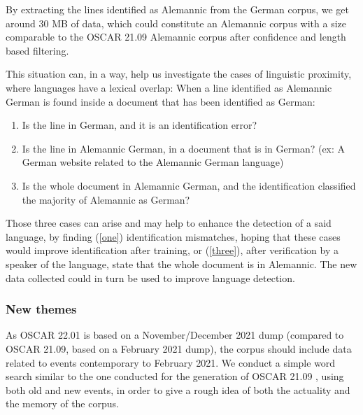 By extracting the lines identified as Alemannic from the German corpus, we get around 30 MB of data, which could constitute an Alemannic corpus with a size comparable to the OSCAR 21.09 Alemannic corpus after confidence and length based filtering.


This situation can, in a way, help us investigate the cases of linguistic proximity, where languages have a lexical overlap: When a line identified as Alemannic German is found inside a document that has been identified as German:
\begin{enumerate}
    \item \label{one} Is the line in German, and it is an identification error?
    \item Is the line in Alemannic German, in a document that is in German? (ex: A German website related to the Alemannic German language)
    \item \label{three} Is the whole document in Alemannic German, and the identification classified the majority of Alemannic as German?
\end{enumerate}

Those three cases can arise and may help to enhance the detection of a said language, by finding (\ref{one}) identification mismatches, hoping that these cases would improve identification after training, or (\ref{three}), after verification by a speaker of the language, state that the whole document is in Alemannic. The new data collected could in turn be used to improve language detection.


\subsubsection{New themes}

As OSCAR 22.01 is based on a November/December 2021 dump (compared to OSCAR 21.09, based on a February 2021 dump), the corpus should include data related to events contemporary to February 2021. We conduct a simple word search similar to the one conducted for the generation of OSCAR 21.09 \cite{abadji-etal-2021-ungoliant}, using both old and new events, in order to give a rough idea of both the actuality and the memory of the corpus.

